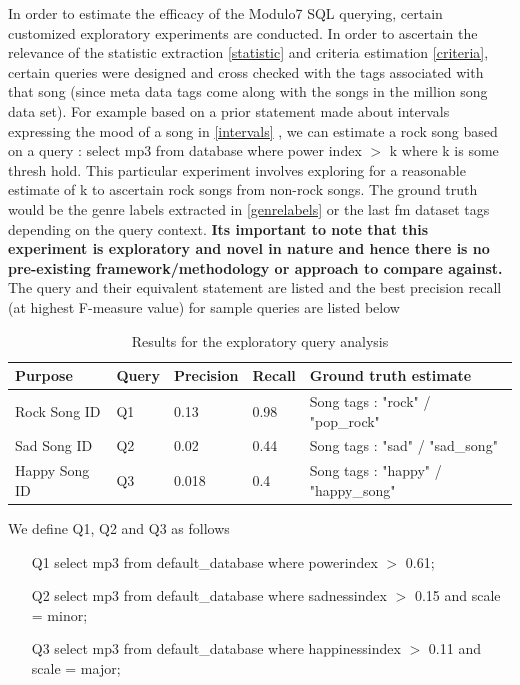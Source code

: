 \noindent In order to estimate the efficacy of the Modulo7 SQL querying, certain customized exploratory experiments are conducted. In order to ascertain the relevance of the statistic extraction \ref{statistic} and criteria estimation \ref{criteria}, certain queries were designed and cross checked with the tags associated with that song (since meta data tags come along with the songs in the million song data set). For example based on a prior statement made about intervals expressing the mood of a song in \ref{intervals} , we can estimate a rock song based on a query : select mp3 from database where power index $>$ k where k is some thresh hold. This particular experiment involves exploring for a reasonable estimate of k to ascertain rock songs from non-rock songs. The ground truth would be the genre labels extracted in \ref{genrelabels} or the last fm dataset tags \cite{msd} depending on the query context. \textbf{Its important to note that this experiment is exploratory and novel in nature and hence there is no pre-existing framework/methodology or approach to compare against.}\\

\noindent The query and their equivalent statement are listed and the best precision recall (at highest F-measure value) for sample queries are listed below \\

\begin{table}[!htb]
\begin{center}
    \begin{tabular}{| l | l | l | l | l |}
    \hline
    Purpose &  Query & Precision  & Recall & Ground truth estimate \\ \hline
    Rock Song ID &  Q1 & 0.13  & 0.98 & Song tags : "rock" / "pop\_rock" \\ \hline
    Sad Song ID &  Q2 & 0.02  & 0.44 & Song tags : "sad" / "sad\_song" \\ \hline
    Happy Song ID &  Q3 & 0.018  & 0.4 & Song tags : "happy" / "happy\_song" \\
    \hline
    \end{tabular}
\end{center}
\caption{Results for the exploratory query analysis}
\end{table}

\newpage

\noindent We define Q1, Q2 and Q3 as follows

\begin{enumerate}
\item [Q1] select mp3 from default\_database where powerindex $>$ 0.61;
\item [Q2] select mp3 from default\_database where sadnessindex $>$ 0.15 and scale = minor;
\item [Q3] select mp3 from default\_database where happinessindex $>$ 0.11 and scale = major;
\end{enumerate}

